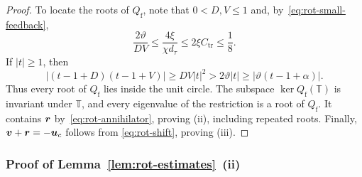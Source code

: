 \begin{proof}
To locate the roots of \(Q_\mathrm{f}\), note that
\(0<D,V\le1\) and, by~\eqref{eq:rot-small-feedback},
\[
\frac{2\vartheta}{DV}\le\frac{4\xi}{\chi d_\tau}
\le2\xi C_\mathrm{tr}\le\frac18.
\]
If \(|t|\ge1\), then
\[
|(t-1+D)(t-1+V)|\ge DV|t|^2
>2\vartheta|t|\ge|\vartheta(t-1+\alpha)|.
\]
Thus every root of \(Q_\mathrm{f}\) lies inside the unit circle.
The subspace \(\ker Q_\mathrm{f}(\mathbb T)\) is invariant under \(\mathbb T\),
and every eigenvalue of the restriction is a root of \(Q_\mathrm{f}\).
It contains \(\bm{r}\) by~\eqref{eq:rot-annihilator}, proving (ii), including
repeated roots. Finally, \(\bm{v}+\bm{r}=-\bm{u}_c\) follows from
\eqref{eq:rot-shift}, proving (iii).
\end{proof}

\subsubsection{Proof of Lemma~\ref{lem:rot-estimates}~(ii)}
\label{app:lb-rotation-transient-proof}
